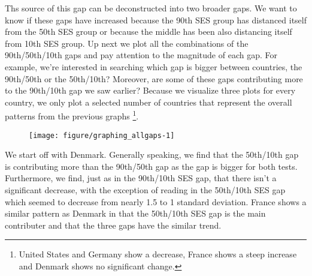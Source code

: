\documentclass[11pt, a4paper]{article}\usepackage[]{graphicx}\usepackage[]{color}
\begin{document}
Ths source of this gap can be deconstructed into two broader gaps. We want to know if these gaps have increased because the 90th SES group has distanced itself from the 50th SES group or because the middle has been also distancing itself from 10th SES group. Up next we plot all the combinations of the 90th/50th/10th gaps and pay attention to the magnitude of each gap. For example, we're interested in searching which gap is bigger between countries, the 90th/50th or the 50th/10th? Moreover, are some of these gaps contributing more to the 90th/10th gap we saw earlier? Because we visualize three plots for every country, we only plot a selected number of countries that represent the overall patterns from the previous graphs \footnote{United States and Germany show a decrease, France shows a steep increase and Denmark shows no significant change.}.

% 
% 
% 

\begin{figure}
\begin{center}


{\centering \texttt{[image: figure/graphing\_allgaps-1]} 

}



\end{center}
\end{figure}

We start off with Denmark. Generally speaking, we find that the 50th/10th gap is contributing more than the 90th/50th gap as the gap is bigger for both tests. Furthermore, we find, just as in the 90th/10th SES gap, that there isn't a significant decrease, with the exception of reading in the 50th/10th SES gap which seemed to decrease from nearly 1.5 to 1 standard deviation. France shows a similar pattern as Denmark in that the 50th/10th SES gap is the main contributer and that the three gaps have the similar trend. 
\end{document}
